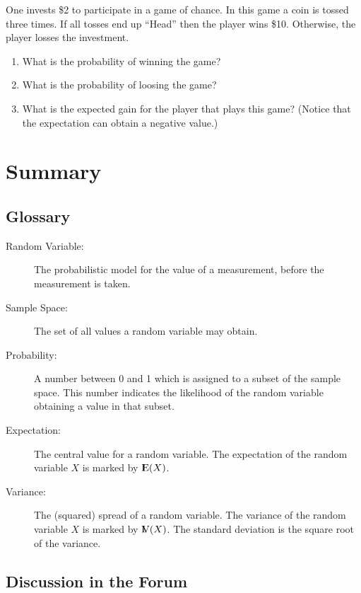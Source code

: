 \documentclass[]{krantz}
\newcommand{\Expec}{{\rm I\kern-.3em E}}
\newcommand{\Var}{{\rm I\kern-.3em V}}
\theoremstyle{definition}
\theoremstyle{definition}
\theoremstyle{definition}
\theoremstyle{remark}
\let\BeginKnitrBlock\begin \let\EndKnitrBlock\end
\begin{document}
\BeginKnitrBlock{exercise}
\protect\hypertarget{exr:unnamed-chunk-50}{}{\label{exr:unnamed-chunk-50}
}One invests \$2 to participate in a game of chance. In this game a coin
is tossed three times. If all tosses end up ``Head'' then the player
wins \$10. Otherwise, the player losses the investment.

\begin{enumerate}
\def\labelenumi{\arabic{enumi}.}
\item
  What is the probability of winning the game?
\item
  What is the probability of loosing the game?
\item
  What is the expected gain for the player that plays this game? (Notice
  that the expectation can obtain a negative value.)
\end{enumerate}
\EndKnitrBlock{exercise}

\section{Summary}\label{summary-3}

\subsection*{Glossary}\label{glossary}


\begin{description}
\item[Random Variable:]
The probabilistic model for the value of a measurement, before the
measurement is taken.
\item[Sample Space:]
The set of all values a random variable may obtain.
\item[Probability:]
A number between 0 and 1 which is assigned to a subset of the sample
space. This number indicates the likelihood of the random variable
obtaining a value in that subset.
\item[Expectation:]
The central value for a random variable. The expectation of the random
variable \(X\) is marked by \(\Expec(X)\).
\item[Variance:]
The (squared) spread of a random variable. The variance of the random
variable \(X\) is marked by \(\Var(X)\). The standard deviation is the
square root of the variance.
\end{description}

\subsection*{Discussion in the Forum}\label{discussion-in-the-forum}
\end{document}
